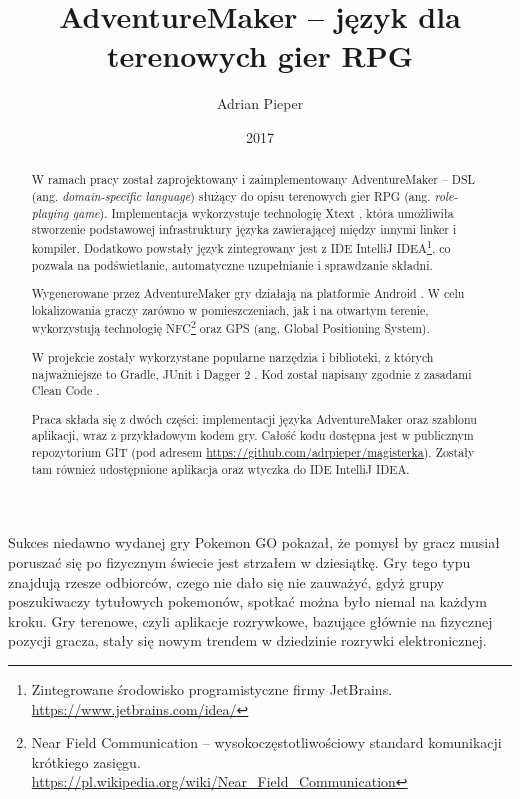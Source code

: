 \documentclass[openright]{xmgr}
\author   {Adrian Pieper}
\title    {AdventureMaker -- język dla terenowych gier RPG}
\date     {2017}
\begin{document}
\begin{abstract}
  W ramach pracy został zaprojektowany i zaimplementowany AdventureMaker -- DSL (ang. \textit{domain-specific language}) służący do opisu terenowych gier RPG (ang. \textit{role-playing game}). Implementacja wykorzystuje technologię Xtext \cite{Xtext:2017:Doc}, która umożliwiła stworzenie podstawowej infrastruktury języka zawierającej między innymi linker i kompiler. Dodatkowo powstały język zintegrowany jest z IDE IntelliJ IDEA\footnote{Zintegrowane środowisko programistyczne firmy JetBrains. \url{https://www.jetbrains.com/idea/}}, co pozwala na podświetlanie, automatyczne uzupełnianie i sprawdzanie składni.
  
  Wygenerowane przez AdventureMaker gry działają na platformie Android \cite{AndroidSDK:2017:Doc}. W celu lokalizowania graczy zarówno w pomieszczeniach, jak i na otwartym terenie, wykorzystują technologię NFC\footnote{Near Field Communication -- wysokoczęstotliwościowy standard komunikacji krótkiego zasięgu. \url{https://pl.wikipedia.org/wiki/Near_Field_Communication}} oraz GPS (ang. Global Positioning System).
  
  W projekcie zostały wykorzystane popularne narzędzia i biblioteki, z których najważniejsze to Gradle\cite{Gradle:2017:Doc}, JUnit\cite{JUnit:2017:Doc} i Dagger 2 \cite{Dagger2:2017:Doc}. Kod został napisany zgodnie z zasadami Clean Code \cite{CleanCode:2005}.
  
  Praca składa się z dwóch części: implementacji języka AdventureMaker oraz szablonu aplikacji, wraz z przykładowym kodem gry. Całość kodu dostępna jest w publicznym repozytorium GIT (pod adresem \url{https://github.com/adrpieper/magisterka}). Zostały tam również udostępnione aplikacja oraz wtyczka do IDE IntelliJ IDEA.
\end{abstract}


\maketitle

\introduction

Sukces niedawno wydanej gry Pokemon GO pokazał, że pomysł by gracz musiał poruszać się po fizycznym świecie jest strzałem w dziesiątkę. Gry tego typu znajdują rzesze odbiorców, czego nie dało się nie zauważyć, gdyż grupy poszukiwaczy tytułowych pokemonów, spotkać można było niemal na każdym kroku. Gry terenowe, czyli aplikacje rozrywkowe, bazujące głównie na fizycznej pozycji gracza, stały się nowym trendem w dziedzinie rozrywki elektronicznej.
\end{document}
